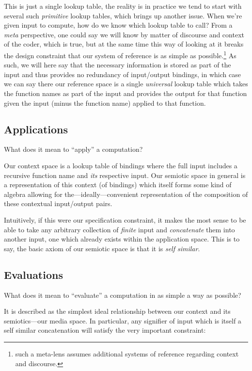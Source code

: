 \documentclass[twoside]{article}
\begin{document}
This is just a single lookup table, the reality is in practice we tend to start with several such \emph{primitive} lookup tables,
which brings up another issue. When we're given input to compute, how do we know which lookup table to call? From a \emph{meta}
perspective, one could say we will know by matter of discourse and context of the coder, which is true, but at the same time this
way of looking at it breaks the design constraint that our system of reference is as simple as possible.\footnote{such a meta-lens
assumes additional systems of reference regarding context and discourse.} As such, we will here say that the necessary information
is stored as part of the input and thus provides no redundancy of input/output bindings, in which case we can say there our reference
space is a single \emph{universal} lookup table which takes the function names as part of the input and provides the output for that
function given the input (minus the function name) applied to that function.

\subsection*{Applications}

What does it mean to ``apply'' a computation?

Our context space is a lookup table of bindings where the full input includes a recursive function name and \emph{its}
respective input.  Our semiotic space in general is a representation of this context (of bindings) which itself forms
some kind of algebra allowing for the---ideally---convenient representation of the composition of these contextual
input/output pairs.

Intuitively, if this were our specification constraint, it makes the most sense to be able to take any arbitrary collection
of \emph{finite} input and \emph{concatenate} them into another input, one which already exists within the application space.
This is to say, the basic axiom of our semiotic space is that it is \emph{self similar}.

\subsection*{Evaluations}

What does it mean to ``evaluate'' a computation in as simple a way as possible?

It is described as the simplest ideal relationship between our context and its semiotics---our media space. In particular,
any signifier of input which is itself a self similar concatenation will satisfy the very important constraint:
\end{document}
